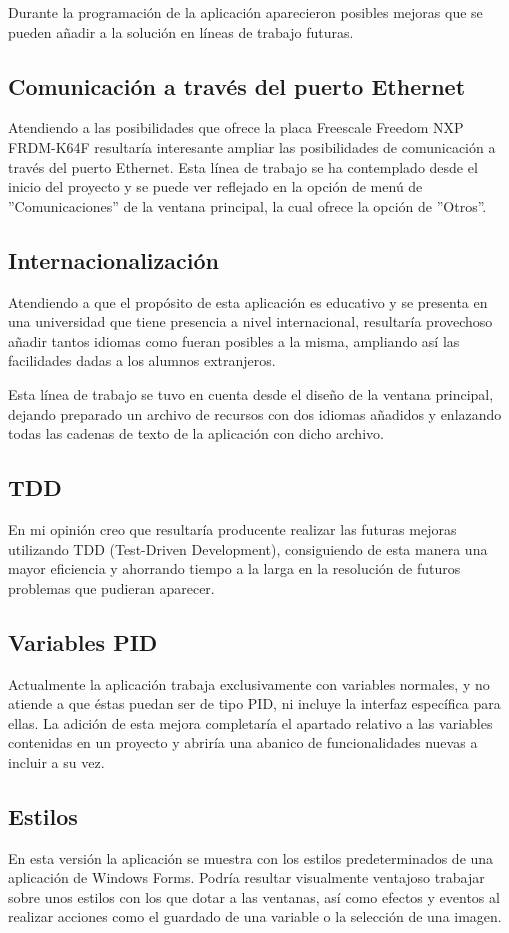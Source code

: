 Durante la programación de la aplicación aparecieron posibles mejoras que se pueden añadir a la solución en líneas de trabajo futuras.

\subsection{Comunicación a través del puerto Ethernet}

Atendiendo a las posibilidades que ofrece la placa Freescale Freedom NXP FRDM-K64F resultaría interesante ampliar las posibilidades de comunicación a través  del puerto Ethernet. Esta línea de trabajo se ha contemplado desde el inicio del proyecto y se puede ver reflejado en la opción de menú de ''Comunicaciones'' de la ventana principal, la cual ofrece la opción de ''Otros''.

\subsection{Internacionalización}

Atendiendo a que el propósito de esta aplicación es educativo y se presenta en una universidad que tiene presencia a nivel internacional, resultaría provechoso añadir tantos idiomas como fueran posibles a la misma, ampliando así las facilidades dadas a los alumnos extranjeros.

Esta línea de trabajo se tuvo en cuenta desde el diseño de la ventana principal, dejando preparado un archivo de recursos con dos idiomas añadidos y enlazando todas las cadenas de texto de la aplicación con dicho archivo.

\subsection{TDD}

En mi opinión creo que resultaría producente realizar las futuras mejoras utilizando TDD (Test-Driven Development), consiguiendo de esta manera una mayor eficiencia y ahorrando tiempo a la larga en la resolución de futuros problemas que pudieran aparecer.

\subsection{Variables PID}

Actualmente la aplicación trabaja exclusivamente con variables normales, y no atiende a que éstas puedan ser de tipo PID, ni incluye la interfaz específica para ellas. La adición de esta mejora completaría el apartado relativo a las variables contenidas en un proyecto y abriría una abanico de funcionalidades nuevas a incluir a su vez.

\subsection{Estilos}

En esta versión la aplicación se muestra con los estilos predeterminados de una aplicación de Windows Forms. Podría resultar visualmente ventajoso trabajar sobre unos estilos con los que dotar a las ventanas, así como efectos y eventos al realizar acciones como el guardado de una variable o la selección de una imagen.
